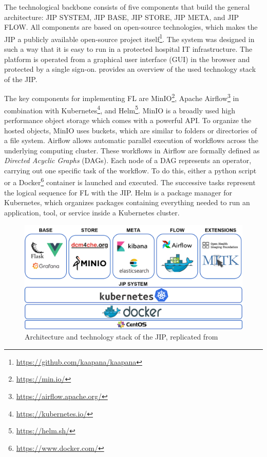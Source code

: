 The technological backbone consists of five components that build the general architecture: JIP SYSTEM, JIP BASE, JIP STORE, JIP META, and JIP FLOW. All components are based on open-source technologies, which makes the JIP a publicly available open-source project itself\footnote{\url{https://github.com/kaapana/kaapana}}. The system was designed in such a way that it is easy to run in a protected hospital IT infrastructure. The platform is operated from a graphical user interface (GUI) in the browser and protected by a single sign-on.  provides an overview of the used technology stack of the JIP.


The key components for implementing FL are MinIO\footnote{\url{https://min.io/}}, Apache Airflow\footnote{\url{https://airflow.apache.org/}} in combination with Kubernetes\footnote{\url{https://kubernetes.io/}}, and Helm\footnote{\url{https://helm.sh/}}.
MinIO is a broadly used high performance object storage which comes with a powerful API. To organize the hosted objects, MinIO uses buckets, which are similar to folders or directories of a file system. 
Airflow allows automatic parallel execution of workflows across the underlying computing cluster. These workflows in Airflow are formally defined as \textit{Directed Acyclic Graphs} (DAGs). Each node of a DAG represents an operator, carrying out one specific task of the workflow. To do this, either a python script or a Docker\footnote{\url{https://www.docker.com/}} container is launched and executed.
The successive tasks represent the logical sequence for FL with the JIP.
Helm is a package manager for Kubernetes, which organizes packages containing everything needed to run an application, tool, or service inside a Kubernetes cluster.

\begin{figure}[htbp]
    \centerline{\includegraphics[width=1.0\columnwidth]{1_Figures/JIParchitecture.png}}
    \caption[Architecture and technology stack of the JIP]{Architecture and technology stack of the JIP, replicated from \cite{Scherer2020JointAnalytics}}
\label{fig:JIP}
\end{figure}
